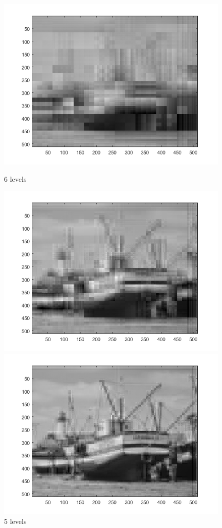 \documentclass[english]{article}
\begin{document}
\begin{figure}[!htb]
  \includegraphics[width=\linewidth]{boat/boat_approx.png}
  \caption{6 levels}\label{fig:awesome_image1}
\endminipage\hfill
{}
  \includegraphics[width=\linewidth]{boat/boat_approx_2.png}
  \caption{5 levels}\label{fig:awesome_image2}
\endminipage\hfill
{}%
  \includegraphics[width=\linewidth]{boat/boat_approx_3.png}

\end{figure}
\end{document}
